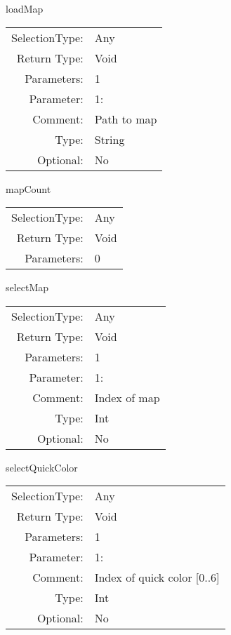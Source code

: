 \item loadMap\\
\begin{tabular}{rl}
  SelectionType: & Any\\
    Return Type: & Void\\
     Parameters: & 1\\
   Parameter: &  1:\\
        Comment: & Path to map\\
           Type: & String\\
       Optional: &  No\\
\end{tabular}

\item mapCount\\
\begin{tabular}{rl}
  SelectionType: & Any\\
    Return Type: & Void\\
     Parameters: & 0\\
\end{tabular}

\item selectMap\\
\begin{tabular}{rl}
  SelectionType: & Any\\
    Return Type: & Void\\
     Parameters: & 1\\
   Parameter: &  1:\\
        Comment: & Index of map\\
           Type: & Int\\
       Optional: &  No\\
\end{tabular}

\item selectQuickColor\\
\begin{tabular}{rl}
  SelectionType: & Any\\
    Return Type: & Void\\
     Parameters: & 1\\
   Parameter: &  1:\\
        Comment: & Index of quick color [0..6]\\
           Type: & Int\\
       Optional: &  No\\
\end{tabular}

